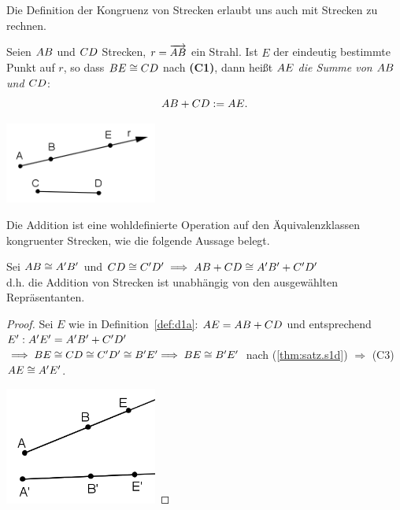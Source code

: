 Die Definition der Kongruenz von Strecken erlaubt uns auch mit
Strecken zu rechnen.


\begin{defi}
\label{def:d1a}
Seien ${AB}$ und ${CD}$ Strecken, $r=\mbox{${\overrightarrow{AB}}$}$ ein
Strahl. Ist $E$ der eindeutig bestimmte Punkt auf $r$, so dass
${BE}\cong{CD}$ nach \textbf{(C1)}, dann hei{\ss}t ${AE}$
{\em die Summe von ${AB}$ und ${CD}$}:
\[{AB}+{CD}:={AE}.\]
\end{defi}

\centerline{\includegraphics[width=5cm]{BILDER/1-2-02-Add.png}}


Die Addition ist eine wohldefinierte Operation auf den
Äquivalenzklassen kongruenter Strecken, wie die folgende Aussage
belegt. 




\begin{thm}\label{thm:satz.s1e}
Sei ${AB}\cong{A'B'}$ und
${CD}\cong{C'D'}\;\Longrightarrow\;{AB}+{CD}
\cong{A'B'}+{C'D'}$\\ d.h. die Addition von Strecken ist
unabh\"{a}ngig von den ausgew\"{a}hlten Repr\"{a}sentanten.
\end{thm}

\begin{proof}
Sei $E$ wie in Definition~\ref{def:d1a}:
${AE}={AB}+{CD}$ und entsprechend $E':\\ {A'E'}={A'B'}+{C'D'}$\\
$\Longrightarrow\;{BE}\cong{CD}\cong{C'D'}\cong{B'E'}
\Longrightarrow\;{BE}\cong{B'E'}$ nach (\ref{thm:satz.s1d})
$\Longrightarrow$ (C3) ${AE}\cong{A'E'}$.

\centerline{\includegraphics[width=5cm]{BILDER/1-2-03-Add.png}}

\end{proof}



